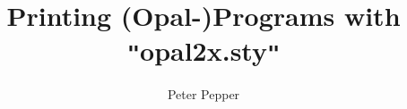 \documentclass[a4paper,12pt]{article}
\begin{document}
\title{Printing (Opal-)Programs with \texttt{"}opal2x.sty\texttt{"}}

\author{Peter Pepper}

\maketitle

\tableofcontents

\clearpage






\end{document}
